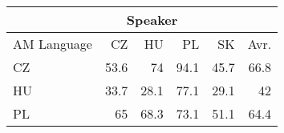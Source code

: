 \begin{tabular}{l|rrrr|r}
\hline
 & \multicolumn{3}{c}{Speaker} & \\
\hline
 AM Language   &   CZ &   HU &   PL &   SK &   Avr. \\
\hline
 CZ            & 53.6 & 74   & 94.1 & 45.7 &   66.8 \\
 HU            & 33.7 & 28.1 & 77.1 & 29.1 &   42   \\
 PL            & 65   & 68.3 & 73.1 & 51.1 &   64.4 \\
\hline
\end{tabular}